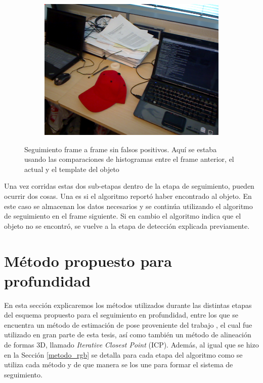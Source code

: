 \begin{figure}
\begin{subfigure}[b]{0.3\textwidth}
		\includegraphics[width=\textwidth]{img/seguimiento_frame_template/frame_template-desk_1-coffee_mug_5-frame_34.png}
	\end{subfigure}

	\caption{Seguimiento frame a frame sin falsos positivos. Aquí se estaba usando las comparaciones de histogramas entre el frame anterior, el actual y el template del objeto}
	\label{frame_template_tracking}
\end{figure}

Una vez corridas estas dos sub-etapas dentro de la etapa de seguimiento, pueden ocurrir dos cosas. Una es si el algoritmo reportó haber encontrado al objeto. En este caso se almacenan los datos necesarios y se continúa utilizando el algoritmo de seguimiento en el frame siguiente. Si en cambio el algoritmo indica que el objeto no se encontró, se vuelve a la etapa de detección explicada previamente.







\section{Método propuesto para profundidad}\label{metodo_rgbd}
En esta sección explicaremos los métodos utilizados durante las distintas etapas del esquema propuesto para el seguimiento en profundidad, entre los que se encuentra un método de estimación de pose proveniente del trabajo \cite{6630856}, el cual fue utilizado en gran parte de esta tesis, así como también un método de alineación de formas 3D, llamado \textit{Iterative Closest Point} (ICP). Además, al igual que se hizo en la Sección \ref{metodo_rgb} se detalla para cada etapa del algoritmo como se utiliza cada método y de que manera se los une para formar el sistema de seguimiento.

